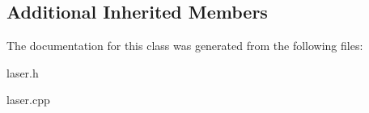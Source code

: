 \subsection*{Additional Inherited Members}


The documentation for this class was generated from the following files\+:\begin{DoxyCompactItemize}
\item 
laser.\+h\item 
laser.\+cpp\end{DoxyCompactItemize}
